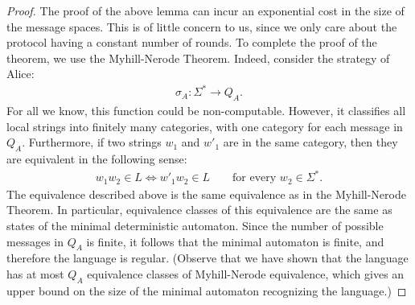 \begin{proof}
The proof of the above lemma can incur an exponential cost in the size of the message spaces. This is of little concern to us, since we only care about the protocol having a constant number of rounds.
  To complete the proof of the theorem, we use the  Myhill-Nerode Theorem.  Indeed, consider the strategy of  Alice: 
  \begin{align*}
  \sigma_A : \Sigma^* \to Q_A.
  \end{align*}
  For all we know, this function could be non-computable. However, it classifies all local strings into finitely many categories, with one category for each message in $Q_A$. Furthermore, if two strings $w_1$ and $w'_1$ are in the same category, then they are equivalent in the following sense: 
  \begin{align}\label{eq:myhill-nerode-equivalence}
  w_1 w_2 \in L \Leftrightarrow w'_1 w_2 \in L 
  \qquad \text{for every $w_2 \in \Sigma^*$.}
  \end{align}
  The equivalence described above is the same equivalence as in the Myhill-Nerode Theorem. In particular, equivalence classes of this equivalence are the same as states of the minimal deterministic automaton. Since the number of possible messages in $Q_A$ is finite, it follows that the minimal automaton is finite, and therefore the language is regular.  (Observe that we have shown that the language has at most $Q_A$ equivalence classes of Myhill-Nerode equivalence, which gives an upper bound on the size of the minimal automaton recognizing the language.)
\end{proof}

